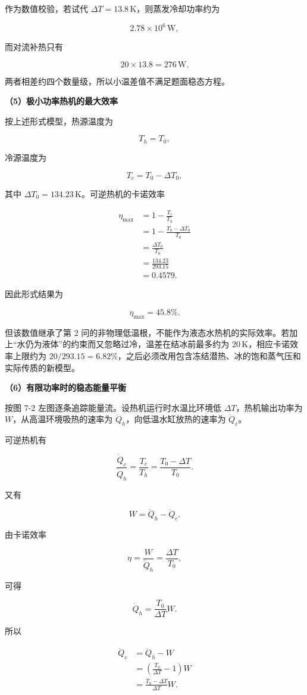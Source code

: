 \documentclass[12pt,a4paper,UTF8]{ctexart}
\begin{document}
作为数值校验，若试代 \(\Delta T=13.8\,\mathrm K\)，则蒸发冷却功率约为

\[
2.78\times10^6\,\mathrm W,
\]

而对流补热只有

\[
20\times13.8=276\,\mathrm W.
\]

两者相差约四个数量级，所以小温差值不满足题面稳态方程。

\textbf{（5）极小功率热机的最大效率}

按上述形式模型，热源温度为

\[T_h=T_0,\]

冷源温度为

\[T_c=T_0-\Delta T_0,\]

其中 \(\Delta T_0=134.23\,\mathrm K\)。可逆热机的卡诺效率

\[
\begin{aligned}
\eta_{\max}
&=1-\frac{T_c}{T_h}\\
&=1-\frac{T_0-\Delta T_0}{T_0}\\
&=\frac{\Delta T_0}{T_0}\\
&=\frac{134.23}{293.15}\\
&=0.4579.
\end{aligned}
\]

因此形式结果为

\[
\boxed{\eta_{\max}=45.8\%}.
\]

但该数值继承了第 2
问的非物理低温根，不能作为液态水热机的实际效率。若加上``水仍为液体''的约束而又忽略过冷，温差在结冰前最多约为
\(20\,\mathrm K\)，相应卡诺效率上限约为
\(20/293.15=6.82\%\)，之后必须改用包含冻结潜热、冰的饱和蒸气压和实际传质的新模型。

\textbf{（6）有限功率时的稳态能量平衡}

按图 7-2 左图逐条追踪能量流。设热机运行时水温比环境低
\(\Delta T\)，热机输出功率为 \(W\)，从高温环境吸热的速率为
\(\dot Q_h\)，向低温水缸放热的速率为 \(\dot Q_c\)。

可逆热机有

\[
\frac{\dot Q_c}{\dot Q_h}=\frac{T_c}{T_h}
=\frac{T_0-\Delta T}{T_0}.
\]

又有

\[
W=\dot Q_h-\dot Q_c.
\]

由卡诺效率

\[
\eta=\frac{W}{\dot Q_h}=\frac{\Delta T}{T_0},
\]

可得

\[
\dot Q_h=\frac{T_0}{\Delta T}W.
\]

所以

\[
\begin{aligned}
\dot Q_c
&=\dot Q_h-W\\
&=\left(\frac{T_0}{\Delta T}-1\right)W\\
&=\frac{T_0-\Delta T}{\Delta T}W.
\end{aligned}
\]
\end{document}

